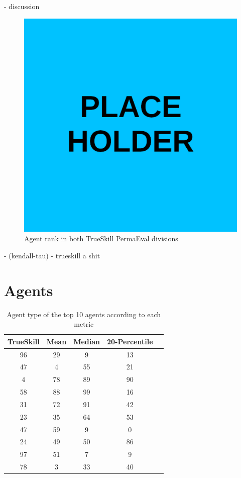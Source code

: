 \begin{code}
    - discussion
\end{code}
\begin{figure}[H]
\centering
    \includegraphics[width=0.8\linewidth]{Results/figures/placeholder.png}
\caption{Agent rank in both TrueSkill PermaEval divisions}
\label{TrueSkillCompare2}
\end{figure}
\begin{code}
    - (kendall-tau)
    - trueskill a shit
\end{code}

\section{Agents}
\begin{table}[H]
\centering
\begin{tabular}{|| c | c | c | c | c ||} 
 \hline
 TrueSkill & Mean & Median & 20-Percentile \\ [0.5ex] 
 \hline\hline
    96 &    29 &       9 &             13 \\
    47 &     4 &      55 &             21 \\
     4 &    78 &      89 &             90 \\
    58 &    88 &      99 &             16 \\
    31 &    72 &      91 &             42 \\
    23 &    35 &      64 &             53 \\
    47 &    59 &       9 &              0 \\
    24 &    49 &      50 &             86 \\
    97 &    51 &       7 &              9 \\
    78 &     3 &      33 &             40 \\ [1ex] 
 \hline
\end{tabular}
\label{TypeRankings}
\caption{Agent type of the top 10 agents according to each metric}
\end{table}

